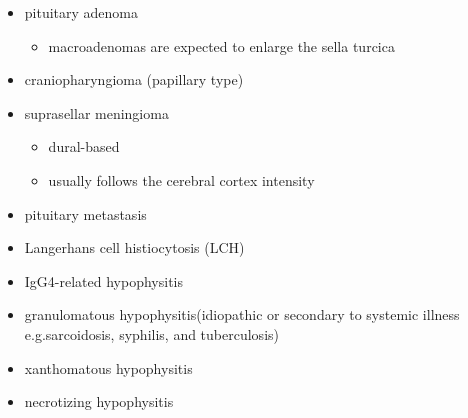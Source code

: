 \begin{itemize}
	\item
	pituitary adenoma
	
	\begin{itemize}
		\item
		macroadenomas are expected to enlarge the sella turcica
	\end{itemize}
	\item
	craniopharyngioma (papillary type)
	\item
	suprasellar meningioma
	
	\begin{itemize}
		\item
		dural-based
		\item
		usually follows the cerebral cortex intensity
	\end{itemize}
	\item
	pituitary metastasis
	\item
	Langerhans cell histiocytosis (LCH)
	\item
	IgG4-related hypophysitis
	\item
	granulomatous hypophysitis(idiopathic or secondary to systemic illness e.g.sarcoidosis, syphilis, and tuberculosis)
	\item
	xanthomatous hypophysitis
	\item
	necrotizing hypophysitis
\end{itemize}